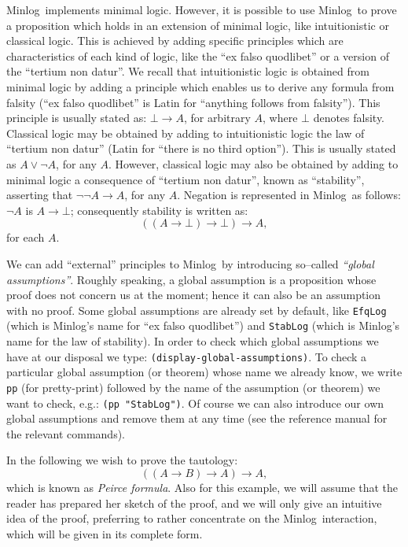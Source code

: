\documentclass[12pt]{amsart}
\newcommand{\falsum}{\bot}
\newcommand{\inquotes}[1]{``#1''}
\newcommand{\mi}{Minlog}
\newcommand{\ob}{\to}
\begin{document}
\mi\ implements minimal logic.  However, it is possible to use \mi\ to
prove a proposition which holds in an extension of minimal logic, like
intuitionistic or classical logic.  This is achieved by adding
specific principles which are characteristics of each kind of logic,
like the \inquotes{ex falso quodlibet} or a version of the
\inquotes{tertium non datur}.  We recall that intuitionistic logic is
obtained from minimal logic by adding a principle which enables us to
derive any formula from falsity (\inquotes{ex falso quodlibet} is
Latin for \inquotes{anything follows from falsity}).  This principle
is usually stated as: $\falsum \ob A$, for arbitrary $A$, where
$\falsum$ denotes falsity.  Classical logic may be obtained by adding
to intuitionistic logic the law of \inquotes{tertium non datur} (Latin
for \inquotes{there is no third option}).  This is usually stated as
$A \lor \neg A$, for any $A$.  However, classical logic may also be
obtained by adding to minimal logic a consequence of \inquotes{tertium
  non datur}, known as \inquotes{stability}, asserting that $\neg \neg
A \to A$, for any $A$.  Negation is represented in \mi\ as follows:
$\neg A $ is $A \to \falsum$; consequently stability is written as:
\begin{equation*}((A \ob \falsum) \ob \falsum) \ob A,\end{equation*}
for each $A$.

We can add \inquotes{external} principles to \mi\ by introducing
so--called \emph{\inquotes{global assumptions}}.  Roughly speaking, a
global assumption is a proposition whose proof does not concern us at
the moment; hence it can also be an assumption with no proof.  Some
global assumptions are already set by default, like \texttt{EfqLog}
(which is \mi's name for \inquotes{ex falso quodlibet}) and
\texttt{StabLog} (which is \mi's name for the law of stability).  In
order to check which global assumptions we have at our disposal we
type: \texttt{(display-global-assumptions)}.  To check a particular
global assumption (or theorem) whose name we already know, we write
\texttt{pp} (for pretty-print) followed by the
name of the assumption (or theorem) we want to check, e.g.:
\texttt{(pp "StabLog")}.  Of course we can also introduce our own
global assumptions and remove them at any time (see the reference
manual for the relevant commands).

In the following we wish to prove the tautology:
\begin{equation*}
  ((A \ob B) \ob A) \ob A,
\end{equation*}
which is known as \emph{Peirce formula}.  Also for this example, we
will assume that the reader has prepared her sketch of the proof, and
we will only give an intuitive idea of the proof, preferring to rather
concentrate on the \mi\ interaction, which will be given in its
complete form.
\end{document}
